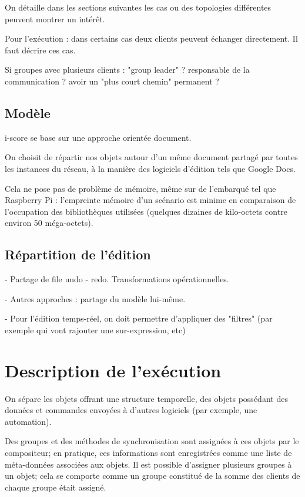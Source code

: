 \documentclass{article}
\begin{document}
On détaille dans les sections suivantes les cas ou des topologies différentes peuvent montrer un intérêt.

Pour l'exécution : dans certains cas deux clients peuvent échanger directement.
Il faut décrire ces cas.

Si groupes avec plusieurs clients : "group leader" ? responsable de la communication ? avoir un "plus court chemin" permanent ?

\subsection{Modèle}
i-score se base sur une approche orientée document.

On choisit de répartir nos objets autour d'un même document partagé par toutes les instances du réseau, 
à la manière des logiciels d'édition tels que Google Docs. %

Cela ne pose pas de problème de mémoire, même sur de l'embarqué tel que Raspberry Pi : l'empreinte mémoire d'un scénario est minime en comparaison de l'occupation des bibliothèques utilisées (quelques dizaines de kilo-octets contre environ 50 méga-octets).

\subsection{Répartition de l'édition}
- Partage de file undo - redo. Transformations opérationnelles. %

- Autres approches : partage du modèle lui-même.

- Pour l'édition temps-réel, on doit permettre d'appliquer des "filtres" (par exemple qui vont rajouter une sur-expression, etc)

\section{Description de l'exécution}\label{sec.description}
On sépare les objets offrant une structure temporelle, des objets possédant des données et commandes envoyées à d'autres logiciels (par exemple, une automation).

Des groupes et des méthodes de synchronisation sont assignées à ces objets par le compositeur; en pratique, ces informations sont enregistrées comme une liste de méta-données associées aux objets.
Il est possible d'assigner plusieurs groupes à un objet; cela se comporte comme un groupe constitué de la somme des clients de chaque groupe était assigné.
\end{document}
